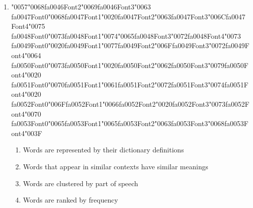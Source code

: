 \documentclass[12pt]{article}
\begin{document}
\begin{enumerate}[label=Q\arabic*.]
\begin{enumerate}[label=(\Alph*)]
    \item GD converges faster because updates are noisier
    \item SGD cannot be used with neural networks
\end{enumerate}
\item {\char"0057}{\char"0068}{\csname fa0046Font2\endcsname\char"0069}{\csname fa0046Font3\endcsname\char"0063} {\csname fa0047Font0\endcsname\char"0068}{\csname fa0047Font1\endcsname\char"0020}{\csname fa0047Font2\endcsname\char"0063}{\csname fa0047Font3\endcsname\char"006C}{\csname fa0047Font4\endcsname\char"0075} {\csname fa0048Font0\endcsname\char"0073}{\csname fa0048Font1\endcsname\char"0074}{\char"0065}{\csname fa0048Font3\endcsname\char"0072}{\csname fa0048Font4\endcsname\char"0073} {\csname fa0049Font0\endcsname\char"0020}{\csname fa0049Font1\endcsname\char"0077}{\csname fa0049Font2\endcsname\char"006F}{\csname fa0049Font3\endcsname\char"0072}{\csname fa0049Font4\endcsname\char"0064} {\csname fa0050Font0\endcsname\char"0073}{\csname fa0050Font1\endcsname\char"0020}{\csname fa0050Font2\endcsname\char"0062}{\csname fa0050Font3\endcsname\char"0079}{\csname fa0050Font4\endcsname\char"0020} {\csname fa0051Font0\endcsname\char"0070}{\csname fa0051Font1\endcsname\char"0061}{\csname fa0051Font2\endcsname\char"0072}{\csname fa0051Font3\endcsname\char"0074}{\csname fa0051Font4\endcsname\char"0020} {\csname fa0052Font0\endcsname\char"006F}{\csname fa0052Font1\endcsname\char"0066}{\csname fa0052Font2\endcsname\char"0020}{\csname fa0052Font3\endcsname\char"0073}{\csname fa0052Font4\endcsname\char"0070} {\csname fa0053Font0\endcsname\char"0065}{\csname fa0053Font1\endcsname\char"0065}{\csname fa0053Font2\endcsname\char"0063}{\csname fa0053Font3\endcsname\char"0068}{\csname fa0053Font4\endcsname\char"003F}
\begin{enumerate}[label=(\Alph*)]
    \item Words are represented by their dictionary definitions
    \item Words that appear in similar contexts have similar meanings
    \item Words are clustered by part of speech
    \item Words are ranked by frequency
\end{enumerate}

\end{enumerate}
\end{document}
